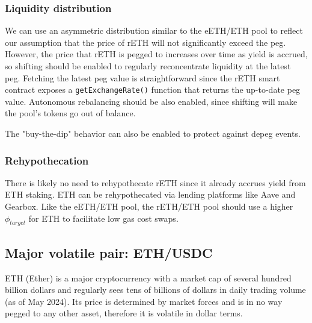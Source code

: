 \documentclass[twocolumn]{article}
\begin{document}
\subsubsection{Liquidity distribution}

We can use an asymmetric distribution similar to the eETH/ETH pool to reflect our assumption that the price of rETH will not significantly exceed the peg. However, the price that rETH is pegged to increases over time as yield is accrued, so shifting should be enabled to regularly reconcentrate liquidity at the latest peg. Fetching the latest peg value is straightforward since the rETH smart contract exposes a \texttt{getExchangeRate()} function that returns the up-to-date peg value. Autonomous rebalancing should be also enabled, since shifting will make the pool's tokens go out of balance.

The "buy-the-dip" behavior can also be enabled to protect against depeg events.

\subsubsection{Rehypothecation}

There is likely no need to rehypothecate rETH since it already accrues yield from ETH staking. ETH can be rehypothecated via lending platforms like Aave and Gearbox. Like the eETH/ETH pool, the rETH/ETH pool should use a higher $\phi_{target}$ for ETH to facilitate low gas cost swaps.

\subsection{Major volatile pair: ETH/USDC}

ETH (Ether)\cite{EthereumWhitepaper} is a major cryptocurrency with a market cap of several hundred billion dollars and regularly sees tens of billions of dollars in daily trading volume (as of May 2024). Its price is determined by market forces and is in no way pegged to any other asset, therefore it is volatile in dollar terms.
\end{document}
